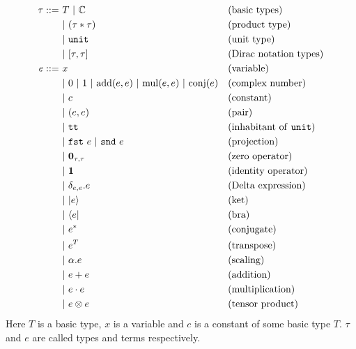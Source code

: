 \begin{definition}[syntax]
  \begin{align*}
    \tau ::= \ 
      & T\ |\ \mathbb{C}                && \text{(basic types)} \\
      & |\ (\tau * \tau)                && \text{(product type)} \\
      & |\ \unit                          && \text{(unit type)} \\
      & |\ [\tau, \tau]                   && \text{(Dirac notation types)} \\ 
    e ::= \ 
      &    x                          && \text{(variable)} \\
      & |\ 0\ |\ 1\ |\ \mathrm{add}(e, e)\ |\ \mathrm{mul}(e, e)\ |\ \mathrm{conj}(e) && \text{(complex number)} \\
      & |\ c                          && \text{(constant)} \\
      & |\ (e, e)                     && \text{(pair)} \\
      & |\ \utt                       && \text{(inhabitant of \unit)} \\
      & |\ \fst\ e\ |\ \snd\ e        && \text{(projection)} \\
      & |\ \mathbf{0}_{\tau, \tau}    && \text{(zero operator)}\\
      & |\ \mathbf{1}                 && \text{(identity operator)}\\
      & |\ \delta_{e, e}.e            && \text{(Delta expression)} \\
      & |\ \ket{e}                    && \text{(ket)} \\
      & |\ \bra{e}                    && \text{(bra)} \\
      & |\ e^*                        && \text{(conjugate)} \\
      & |\ e^T                        && \text{(transpose)} \\
      & |\ \alpha.e                   && \text{(scaling)} \\
      & |\ e + e                      && \text{(addition)} \\
      & |\ e \cdot e                  && \text{(multiplication)} \\
      & |\ e \otimes e                && \text{(tensor product)}
    \end{align*}
  Here $T$ is a basic type, $x$ is a variable and $c$ is a constant of some basic type $T$. $\tau$ and $e$ are called types and terms respectively.
\end{definition}

